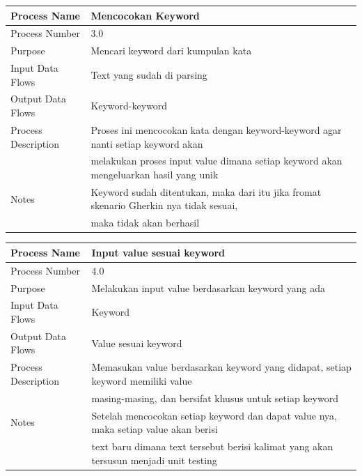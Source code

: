 \documentclass[a4paper,twoside]{article}
\begin{document}
\begin{enumerate}
\begin{center}
\begin{tabular}{ |l|l| } 
 \hline
 Process Name & Mencocokan Keyword \\ 
 \hline
 Process Number & 3.0  \\ 
 \hline
 Purpose & Mencari keyword dari kumpulan kata \\ 
 \hline
 Input Data Flows & Text yang sudah di parsing  \\
 \hline
 Output Data Flows & Keyword-keyword \\
 \hline
 Process Description & Proses ini mencocokan kata dengan keyword-keyword agar nanti setiap keyword akan\\
 & melakukan proses input value dimana setiap keyword akan mengeluarkan hasil yang unik\\
 \hline
 Notes & Keyword sudah ditentukan, maka dari itu jika fromat skenario Gherkin nya tidak sesuai, \\
 & maka tidak akan berhasil\\
 \hline
\end{tabular}
\end{center}

\begin{center}
\begin{tabular}{ |l|l| } 
 \hline
 Process Name & Input value sesuai keyword \\ 
 \hline
 Process Number & 4.0  \\ 
 \hline
 Purpose & Melakukan input value berdasarkan keyword yang ada \\ 
 \hline
 Input Data Flows & Keyword \\
 \hline
 Output Data Flows & Value sesuai keyword \\
 \hline
 Process Description & Memasukan value berdasarkan keyword yang didapat, setiap keyword memiliki value\\
 & masing-masing, dan bersifat khusus untuk setiap keyword\\
 \hline
 Notes & Setelah mencocokan setiap keyword dan dapat value nya, maka setiap value akan berisi \\
 & text baru dimana text tersebut berisi kalimat yang akan tersusun menjadi unit testing\\
 \hline
\end{tabular}
\end{center}


\end{enumerate}
\end{document}
